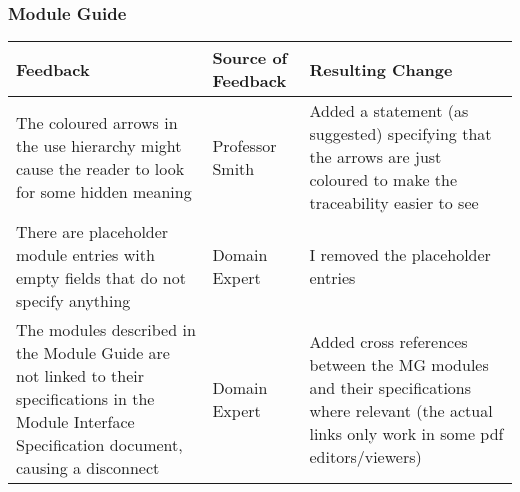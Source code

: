 \documentclass{article}
\begin{document}
\subsubsection{Module Guide}
\begin{longtable}{p{5cm}p{4cm}p{5cm}}\toprule
    Feedback & Source of Feedback & Resulting Change \\\midrule
    The coloured arrows in the use hierarchy might cause the reader to look for some hidden meaning & Professor Smith & Added a statement (as suggested) specifying that the arrows are just coloured to make the traceability easier to see \\ 
    \addlinespace[0.5cm]

    There are placeholder module entries with empty fields that do not specify anything & Domain Expert & I removed the placeholder entries \\
    \addlinespace[0.5cm]

    The modules described in the Module Guide are not linked to their specifications in the Module Interface Specification document, causing a disconnect & Domain Expert & Added cross references between the MG modules and their specifications where relevant (the actual links only work in some pdf editors/viewers) \\


    \bottomrule
\end{longtable}

\newpage
\end{document}
